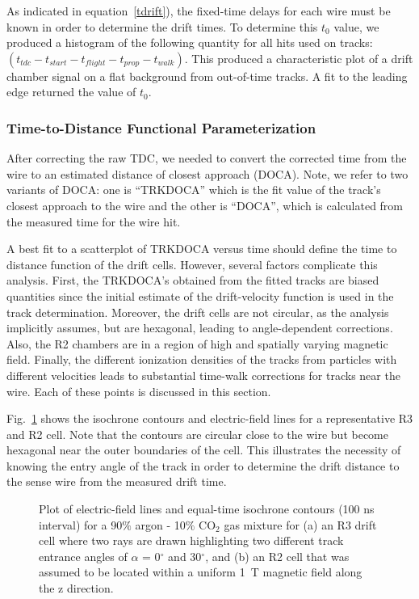 As indicated in equation~\ref{tdrift}), the fixed-time delays 
for each wire must be known in order to determine the drift times.   To determine
this $t_0$ value, we produced a histogram of the following quantity for all hits
used on tracks:$ ( t_{tdc} - t_{start} - t_{flight} - t_{prop} - t_{walk} )$.
This produced a characteristic plot of a drift chamber signal on a flat
background from out-of-time tracks.  
A fit to the leading edge returned the value of $t_0$.

\subsubsection{Time-to-Distance Functional Parameterization}
\label{tdistcal}
After correcting the raw TDC, we needed to convert the corrected time from
the wire to an estimated distance of closest approach (DOCA).
Note, we refer to two variants of DOCA: one is ``TRKDOCA'' which is the
fit value of the track's closest approach to the wire and the other is ``DOCA'',
which is calculated from the measured time for the wire hit.
 
A best fit to a scatterplot of TRKDOCA versus time should define the time to
distance function of the drift cells. However, several factors 
complicate this analysis.  First, the TRKDOCA's obtained from the fitted 
tracks are biased quantities since the initial estimate of the drift-velocity function 
is used in the track determination.  Moreover, the drift cells are 
not circular, as the analysis implicitly assumes, but are hexagonal, leading 
to angle-dependent corrections.   Also, the R2 chambers are in a 
region of high and spatially varying magnetic field.  Finally, the different 
ionization densities of the tracks from particles with different velocities 
leads to substantial time-walk corrections for tracks near the wire.  Each of 
these points is discussed in this section.

Fig.~\ref{garfield-isochrones} shows the isochrone contours and electric-field lines for 
a representative R3 and R2 cell.  Note that the contours are circular close 
to the wire but become hexagonal near the outer boundaries of the cell.  This 
illustrates the necessity of knowing the entry angle of the track in order to 
determine the drift distance to the sense wire from the measured drift time.

\begin{figure}[htpb]
\vspace{8cm} 
\caption{\small{Plot of electric-field lines and equal-time isochrone contours
(100 ns interval) for a 90$\%$ argon - 10$\%$ CO$_2$ gas mixture for (a) an R3
drift cell where two rays are drawn highlighting two different track entrance 
angles of $\alpha$ = 0$^{\circ}$ and 30$^{\circ}$, and (b) an R2 cell that 
was assumed to be located within a uniform 1~T magnetic field along the z 
direction.}}
\label{garfield-isochrones}
\end{figure}

